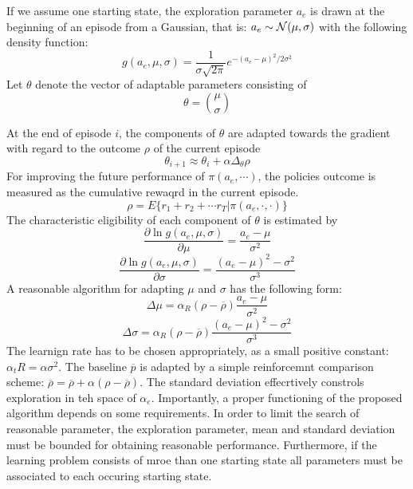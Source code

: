 \documentclass[10.5pt]{article}
\begin{document}
If we assume one starting state, the exploration parameter $a_e$ is drawn at the beginning of an episode from a Gaussian, that is: $a_e\sim {\cal N}(\mu, \sigma)$ with the following density function: 
\begin{equation}
g(a_e, \mu, \sigma) = \dfrac{1}{\sigma\sqrt{2\pi}}e^{-(a_e-\mu)^2/2\sigma^2}
\end{equation}
Let $\theta$ denote the vector of adaptable parameters consisting of
\begin{equation}
\theta = {\mu \choose \sigma}
\end{equation}

At the end of episode $i$, the components of $\theta$ are adapted towards the gradient with regard to the outcome $\rho$ of the current episode 
\begin{equation}
\theta_{i+1} \approx \theta_i +\alpha \Delta_\theta \rho
\end{equation}
For improving the future performance of $\pi(a_e, \cdots)$, the policies outcome is measured as the cumulative rewaqrd in the current episode. 
\begin{equation}
\rho = E\{r_1+r_2 + \cdots r_T|\pi (a_e, \cdot, \cdot)\}
\end{equation}
The characteristic eligibility of each component of $\theta$ is estimated by
\begin{equation}
\dfrac{\partial \ln g(a_e, \mu, \sigma)}{\partial \mu} = \dfrac{a_e-\mu}{\sigma^2}
\end{equation}
\begin{equation}
\dfrac{\partial \ln g(a_e, \mu, \sigma)}{\partial \sigma} = \dfrac{(a_e-\mu)^2-\sigma^2}{\sigma^3}
\end{equation}
A reasonable algorithm for adapting $\mu$ and $\sigma$ has the following form:
\begin{equation}
\Delta \mu = \alpha_R(\rho - \overline{\rho})\dfrac{a_e-\mu}{\sigma^2}
\end{equation}
\begin{equation}
\Delta \sigma = \alpha_R(\rho - \overline{\rho})\dfrac{(a_e-\mu)^2-\sigma^2}{\sigma^3}
\end{equation}
The learnign rate has to be chosen appropriately, as a small positive constant: $\alpha_tR = \alpha\sigma^2$. The baseline $\overline{p}$ is adapted by a simple reinforcemnt comparison scheme: $\overline{\rho} = \overline{\rho} +\alpha(\rho - \overline{\rho})$. The standard deviation effecrtively constrols exploration in teh space of $\alpha_e$. Importantly, a proper functioning of the proposed algorithm depends on some requirements. In order to limit the search of reasonable parameter, the exploration parameter, mean and standard deviation must be bounded for obtaining reasonable performance. Furthermore, if the learning problem consists of mroe than one starting state all parameters must be associated to each occuring starting state. \\
\end{document}
